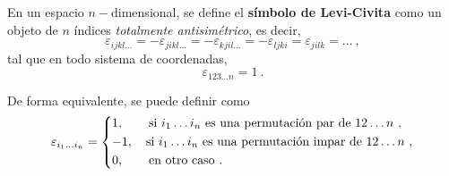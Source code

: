 \begin{defi} 
    En un espacio $n-$dimensional, se define el \textbf{símbolo de Levi-Civita} como un objeto de $n$ índices \emph{totalmente antisimétrico}, es decir,
    \begin{equation}
        \varepsilon_{ijkl\dots} = -\varepsilon_{jikl\dots} = - \varepsilon_{kjil\dots} = - \varepsilon_{ljki} = \varepsilon_{jilk} = \dots \ ,
    \end{equation}
    tal que en todo sistema de coordenadas,
    \begin{equation}
        \varepsilon_{123 \dots n} = 1 \ .
    \end{equation}

    De forma equivalente, se puede definir como
    \begin{equation}
        \varepsilon_{i_1 \dots i_n} = \begin{dcases}
            1, \qquad \text{si } i_1 \dots i_n \text{ es una permutación par de } 12 \dots n \ , \\
            -1, \quad \text{si } i_1 \dots i_n \text{ es una permutación impar de } 12 \dots n \ , \\
            0, \qquad \text{en otro caso} \ .
        \end{dcases}
    \end{equation}
\end{defi}


